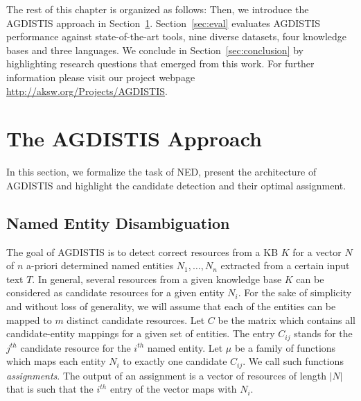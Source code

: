 The rest of this chapter is organized as follows: 
Then, we introduce the AGDISTIS approach in Section~\ref{sec:approach}. %
Section~\ref{sec:eval} evaluates AGDISTIS performance against state-of-the-art tools, nine diverse datasets, four knowledge bases and three languages. 
We conclude in Section~\ref{sec:conclusion} by highlighting research questions that emerged from this work.
For further information please visit our project webpage \url{http://aksw.org/Projects/AGDISTIS}.


\section{The AGDISTIS Approach} 
\label{sec:approach}

In this section, we formalize the task of \ac{NED}, present the architecture of AGDISTIS and highlight the candidate detection and their optimal assignment. 

\subsection{Named Entity Disambiguation}
\label{sec:ned}

The goal of AGDISTIS is to detect correct resources from a \ac{KB} $K$ for a vector $N$ of $n$ a-priori determined named entities $N_1,\ldots,N_n$ extracted from a certain input text $T$.
In general, several resources from a given knowledge base $K$ can be considered as candidate resources for a given entity $N_i$.
For the sake of simplicity and without loss of generality, we will assume that each of the entities can be mapped to $m$ distinct candidate resources.
Let $C$ be the matrix which contains all candidate-entity mappings for a given set of entities.
The entry $C_{ij}$ stands for the $j^{th}$ candidate resource for the $i^{th}$ named entity. 
Let $\mu$ be a family of functions which maps each entity $N_i$ to exactly one candidate $C_{ij}$. 
We call such functions \emph{assignments}.
The output of an assignment is a vector of resources of length $|N|$ that is such that the $i^{th}$ entry of the vector maps with $N_i$.

